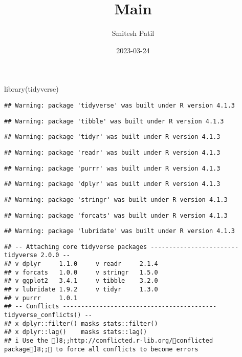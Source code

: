 \documentclass[
]{article}
\title{Main}
\author{Smitesh Patil}
\date{2023-03-24}
\newenvironment{Shaded}{\begin{snugshade}}{\end{snugshade}}
\newcommand{\FunctionTok}[1]{\textcolor[rgb]{0.00,0.00,0.00}{#1}}
\newcommand{\NormalTok}[1]{#1}
\begin{document}
\maketitle

\begin{Shaded}
\begin{Highlighting}[]
\FunctionTok{library}\NormalTok{(tidyverse)}
\end{Highlighting}
\end{Shaded}

\begin{verbatim}
## Warning: package 'tidyverse' was built under R version 4.1.3
\end{verbatim}

\begin{verbatim}
## Warning: package 'tibble' was built under R version 4.1.3
\end{verbatim}

\begin{verbatim}
## Warning: package 'tidyr' was built under R version 4.1.3
\end{verbatim}

\begin{verbatim}
## Warning: package 'readr' was built under R version 4.1.3
\end{verbatim}

\begin{verbatim}
## Warning: package 'purrr' was built under R version 4.1.3
\end{verbatim}

\begin{verbatim}
## Warning: package 'dplyr' was built under R version 4.1.3
\end{verbatim}

\begin{verbatim}
## Warning: package 'stringr' was built under R version 4.1.3
\end{verbatim}

\begin{verbatim}
## Warning: package 'forcats' was built under R version 4.1.3
\end{verbatim}

\begin{verbatim}
## Warning: package 'lubridate' was built under R version 4.1.3
\end{verbatim}

\begin{verbatim}
## -- Attaching core tidyverse packages ------------------------ tidyverse 2.0.0 --
## v dplyr     1.1.0     v readr     2.1.4
## v forcats   1.0.0     v stringr   1.5.0
## v ggplot2   3.4.1     v tibble    3.2.0
## v lubridate 1.9.2     v tidyr     1.3.0
## v purrr     1.0.1     
## -- Conflicts ------------------------------------------ tidyverse_conflicts() --
## x dplyr::filter() masks stats::filter()
## x dplyr::lag()    masks stats::lag()
## i Use the ]8;;http://conflicted.r-lib.org/conflicted package]8;; to force all conflicts to become errors
\end{verbatim}
\end{document}
